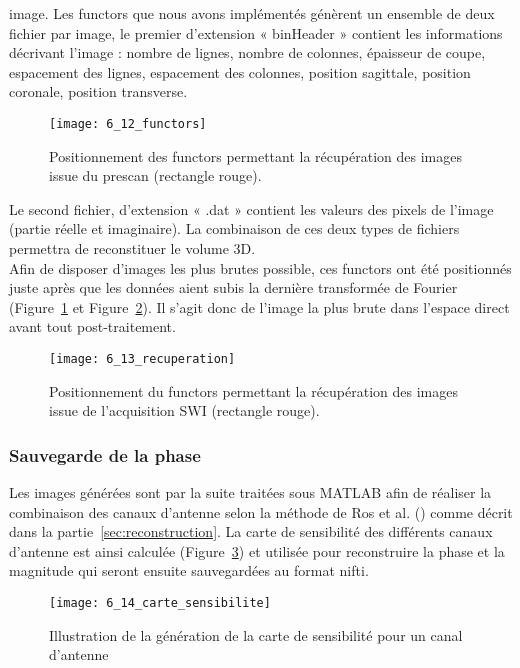 {image. Les functors que nous avons implémentés génèrent un ensemble de deux fichier par image, le
premier d’extension « binHeader » contient les informations décrivant l’image : nombre de lignes,
nombre de colonnes, épaisseur de coupe, espacement des lignes, espacement des colonnes, position
sagittale, position coronale, position transverse.\\
\begin{figure}[!t]
\centering
\texttt{[image: 6\_12\_functors]}
\caption{Positionnement des functors permettant la récupération des images issue du prescan (rectangle rouge).}
\label{fig:6_12_functors}	
\end{figure}
Le second fichier, d’extension « .dat » contient les valeurs des pixels de l’image (partie réelle et
imaginaire). La combinaison de ces deux types de fichiers permettra de reconstituer le volume 3D.\\
Afin de disposer d’images les plus brutes possible, ces functors ont été positionnés juste après
que les données aient subis la dernière transformée de Fourier (Figure~\ref{fig:6_12_functors} et Figure~\ref{fig:6_13_recuperation}). Il s’agit donc
de l’image la plus brute dans l’espace direct avant tout post-traitement.\\
\begin{figure}[!t]
\centering
\texttt{[image: 6\_13\_recuperation]}
\caption{Positionnement du functors permettant la récupération des images issue de l’acquisition SWI (rectangle rouge).}
\label{fig:6_13_recuperation}	
\end{figure}
\subsubsection{Sauvegarde de la phase}
Les images générées sont par la suite traitées sous MATLAB afin de réaliser la combinaison des
canaux d’antenne selon la méthode de Ros et al. (\cite{Ros2009}) comme décrit dans la partie~\ref{sec:reconstruction}. La carte de
sensibilité des différents canaux d’antenne est ainsi calculée (Figure~\ref{fig:6_14_carte_sensibilite}) et utilisée pour reconstruire
la phase et la magnitude qui seront ensuite sauvegardées au format nifti.\\
\begin{figure}[!b]
\centering
\texttt{[image: 6\_14\_carte\_sensibilite]}
\caption{Illustration de la génération de la carte de sensibilité pour un canal d’antenne}
\label{fig:6_14_carte_sensibilite}	
\end{figure}
}
